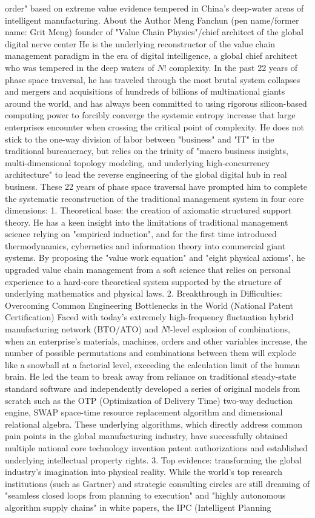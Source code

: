 \documentclass[11pt,a4paper]{article}
\begin{document}
order" based on extreme value evidence tempered in China's deep-water areas of intelligent manufacturing. About the Author Meng Fanchun (pen name/former name: Grit Meng) founder of "Value Chain Physics"/chief architect of the global digital nerve center He is the underlying reconstructor of the value chain management paradigm in the era of digital intelligence, a global chief architect who was tempered in the deep waters of $N!$ complexity. In the past 22 years of phase space traversal, he has traveled through the most brutal system collapses and mergers and acquisitions of hundreds of billions of multinational giants around the world, and has always been committed to using rigorous silicon-based computing power to forcibly converge the systemic entropy increase that large enterprises encounter when crossing the critical point of complexity. He does not stick to the one-way division of labor between "business" and "IT" in the traditional bureaucracy, but relies on the trinity of "macro business insights, multi-dimensional topology modeling, and underlying high-concurrency architecture" to lead the reverse engineering of the global digital hub in real business. These 22 years of phase space traversal have prompted him to complete the systematic reconstruction of the traditional management system in four core dimensions: 1. Theoretical base: the creation of axiomatic structured support theory. He has a keen insight into the limitations of traditional management science relying on "empirical induction", and for the first time introduced thermodynamics, cybernetics and information theory into commercial giant systems. By proposing the "value work equation" and "eight physical axioms", he upgraded value chain management from a soft science that relies on personal experience to a hard-core theoretical system supported by the structure of underlying mathematics and physical laws. 2. Breakthrough in Difficulties: Overcoming Common Engineering Bottlenecks in the World (National Patent Certification) Faced with today’s extremely high-frequency fluctuation hybrid manufacturing network (BTO/ATO) and $N!$-level explosion of combinations, when an enterprise’s materials, machines, orders and other variables increase, the number of possible permutations and combinations between them will explode like a snowball at a factorial level, exceeding the calculation limit of the human brain. He led the team to break away from reliance on traditional steady-state standard software and independently developed a series of original models from scratch such as the OTP (Optimization of Delivery Time) two-way deduction engine, SWAP space-time resource replacement algorithm and dimensional relational algebra. These underlying algorithms, which directly address common pain points in the global manufacturing industry, have successfully obtained multiple national core technology invention patent authorizations and established underlying intellectual property rights. 3. Top evidence: transforming the global industry's imagination into physical reality. While the world's top research institutions (such as Gartner) and strategic consulting circles are still dreaming of "seamless closed loops from planning to execution" and "highly autonomous algorithm supply chains" in white papers, the IPC (Intelligent Planning 
\end{document}
